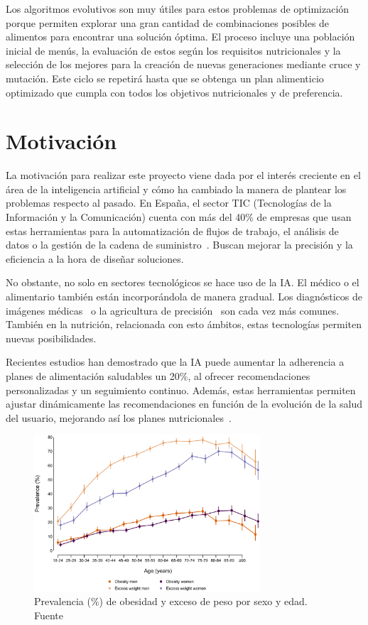 Los algoritmos evolutivos son muy útiles para estos problemas de optimización porque permiten explorar una gran cantidad de combinaciones posibles de alimentos para encontrar una solución óptima. El proceso incluye una población inicial de menús, la evaluación de estos según los requisitos nutricionales y la selección de los mejores para la creación de nuevas generaciones mediante cruce y mutación. Este ciclo se repetirá hasta que se obtenga un plan alimenticio optimizado que cumpla con todos los objetivos nutricionales y de preferencia.

\section{Motivación}

La motivación para realizar este proyecto viene dada por el interés creciente en el área de la inteligencia artificial y cómo ha cambiado la manera de plantear los problemas respecto al pasado. En España, el sector TIC (Tecnologías de la Información y la Comunicación) cuenta con más del 40\% de empresas que usan estas herramientas para la automatización de flujos de trabajo, el análisis de datos o la gestión de la cadena de suministro~\cite{ontsi2023}. Buscan mejorar la precisión y la eficiencia a la hora de diseñar soluciones.

No obstante, no solo en sectores tecnológicos se hace uso de la IA. El médico o el alimentario también están incorporándola de manera gradual. Los diagnósticos de imágenes médicas~\cite{philips2024} o la agricultura de precisión~\cite{majeed2024} son cada vez más comunes. También en la nutrición, relacionada con esto ámbitos, estas tecnologías permiten nuevas posibilidades.

Recientes estudios han demostrado que la IA puede aumentar la adherencia a planes de alimentación saludables un 20\%, al ofrecer recomendaciones personalizadas y un seguimiento continuo. Además, estas herramientas permiten ajustar dinámicamente las recomendaciones en función de la evolución de la salud del usuario, mejorando así los planes nutricionales~\cite{oh2021systematic}.

\begin{figure}[H]
    \centering
    \includegraphics[width=0.75\textwidth]{figures/prevalencia-obesidad.png}
    \caption{Prevalencia (\%) de obesidad y exceso de peso por sexo y edad. Fuente \cite{ene-covid}}
    \label{fig:prevalencia-obesidad}
\end{figure}

